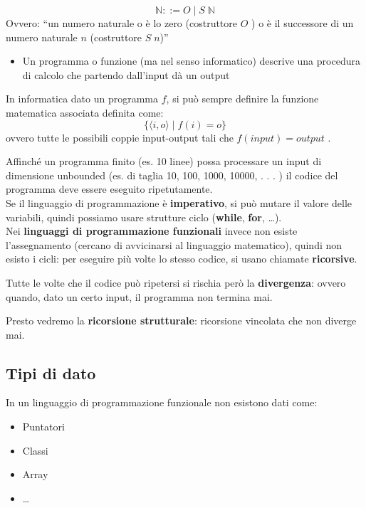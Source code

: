 \documentclass[
  a4paper,
]{article}
\providecommand{\tightlist}{%
  \setlength{\itemsep}{0pt}\setlength{\parskip}{0pt}}
\begin{document}
\begin{examplebox}[Esempio]

\[
\mathbb{N} ::= O \; |\; S\;\mathbb{N}
\] Ovvero: ``un numero naturale o è lo zero (costruttore \(O\) ) o è il
successore di un numero naturale \(n\) (costruttore \(S \; n\))''

\end{examplebox}

\begin{itemize}
\tightlist
\item
  Un programma o funzione (ma nel senso informatico) descrive una
  procedura di calcolo che partendo dall'input dà un output
\end{itemize}

In informatica dato un programma \(f\), si può sempre definire la
funzione matematica associata definita come: \[
\{\langle i, o \rangle \; | \; f(i) = o\}
\] ovvero tutte le possibili coppie input-output tali che
\(f(input) = output\) .

Affinché un programma finito (es. 10 linee) possa processare un input di
dimensione unbounded (es. di taglia 10, 100, 1000, 10000, . . . ) il
codice del programma deve essere eseguito ripetutamente.\\
Se il linguaggio di programmazione è \textbf{imperativo}, si può mutare
il valore delle variabili, quindi possiamo usare strutture ciclo
(\textbf{while}, \textbf{for}, \ldots).\\
Nei \textbf{linguaggi di programmazione funzionali} invece non esiste
l'assegnamento (cercano di avvicinarsi al linguaggio matematico), quindi
non esisto i cicli: per eseguire più volte lo stesso codice, si usano
chiamate \textbf{ricorsive}.

Tutte le volte che il codice può ripetersi si rischia però la
\textbf{divergenza}: ovvero quando, dato un certo input, il programma
non termina mai.

Presto vedremo la \textbf{ricorsione strutturale}: ricorsione vincolata
che non diverge mai.

\hypertarget{tipi-di-dato}{%
\subsection{Tipi di dato}\label{tipi-di-dato}}

In un linguaggio di programmazione funzionale non esistono dati come:

\begin{itemize}
\tightlist
\item
  Puntatori
\item
  Classi
\item
  Array
\item
  \ldots{}
\end{itemize}
\end{document}
